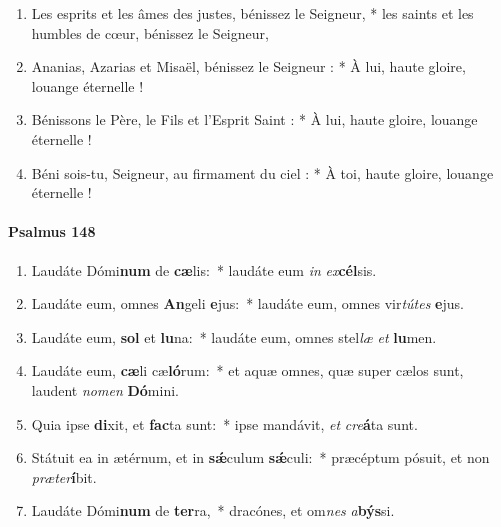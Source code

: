 \documentclass[twoside]{article}
\begin{document}
\begin{paracol}[1]{2}
\begin{enumerate}[wide, itemsep=0mm, labelwidth=!, labelindent=0pt, label=\color{gregoriocolor}\theenumi]
\item Les esprits et les âmes des justes,
   bénissez le Seigneur, *
 les saints et les humbles de cœur,
   bénissez le Seigneur,
\item Ananias, Azarias et Misaël,
   bénissez le Seigneur : *
À lui, haute gloire, louange éternelle !

\item Bénissons le Père, le Fils et l'Esprit Saint : *
À lui, haute gloire, louange éternelle !

\item Béni sois-tu, Seigneur, au firmament du ciel : *
À toi, haute gloire, louange éternelle !
\end{enumerate}

\switchcolumn*
\paragraph{Psalmus 148}


\begin{enumerate}[wide, itemsep=0mm, labelwidth=!, labelindent=0pt, label=\color{gregoriocolor}\theenumi]
\item Laudáte Dómi\textbf{num} de \textbf{cæ}lis:~* laudáte eum \textit{in} \textit{ex}\textbf{cél}sis.

\item Laudáte eum, omnes \textbf{An}geli \textbf{e}jus:~* laudáte eum, omnes vir\textit{tú}\textit{tes} \textbf{e}jus.

\item Laudáte eum, \textbf{sol} et \textbf{lu}na:~* laudáte eum, omnes stel\textit{læ} \textit{et} \textbf{lu}men.

\item Laudáte eum, \textbf{cæ}li cæ\textbf{ló}rum:~* et aquæ omnes, quæ super cælos sunt, laudent \textit{no}\textit{men} \textbf{Dó}mini.

\item Quia ipse \textbf{di}xit, et \textbf{fac}ta sunt:~* ipse mandávit, \textit{et} \textit{cre}\textbf{á}ta sunt.

\item Státuit ea in ætérnum, et in \textbf{sǽ}culum \textbf{sǽ}culi:~* præcéptum pósuit, et non \textit{præ}\textit{ter}\textbf{í}bit.

\item Laudáte Dómi\textbf{num} de \textbf{ter}ra,~* dracónes, et om\textit{nes} \textit{a}\textbf{býs}si.


\end{enumerate}
\end{paracol}
\end{document}
